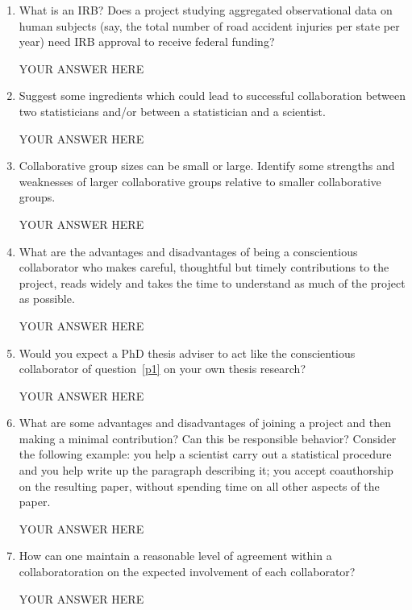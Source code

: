 \documentclass[12pt]{article}
\begin{document}
\begin{enumerate}

\item What is an IRB? Does a project studying aggregated observational data on human subjects (say, the total number of road accident injuries per state per year) need IRB approval to receive federal funding?

YOUR ANSWER HERE

\item Suggest some ingredients which could lead to successful collaboration between two statisticians and/or between a statistician and a scientist.

YOUR ANSWER HERE

\item Collaborative group sizes can be small or large. Identify some strengths and weaknesses of larger collaborative groups relative to smaller collaborative groups.

YOUR ANSWER HERE
 
\item \label{p1} What are the advantages and disadvantages of being a conscientious collaborator who makes careful, thoughtful but timely contributions to the project, reads widely and takes the time to understand as much of the project as possible.

YOUR ANSWER HERE

\item Would you expect a PhD thesis adviser to act like the conscientious collaborator of question~\ref{p1} on your own thesis research? 

YOUR ANSWER HERE

\item What are some advantages and disadvantages of joining a project and then making a minimal contribution? Can this be responsible behavior? Consider the following example: you help a scientist carry out a statistical procedure and you help write up the paragraph describing it; you accept coauthorship on the resulting paper, without spending time on all other aspects of the paper.

YOUR ANSWER HERE

\item How can one maintain a reasonable level of agreement within a collaboratoration on the expected involvement of each collaborator?

YOUR ANSWER HERE

\end{enumerate}
\end{document}
